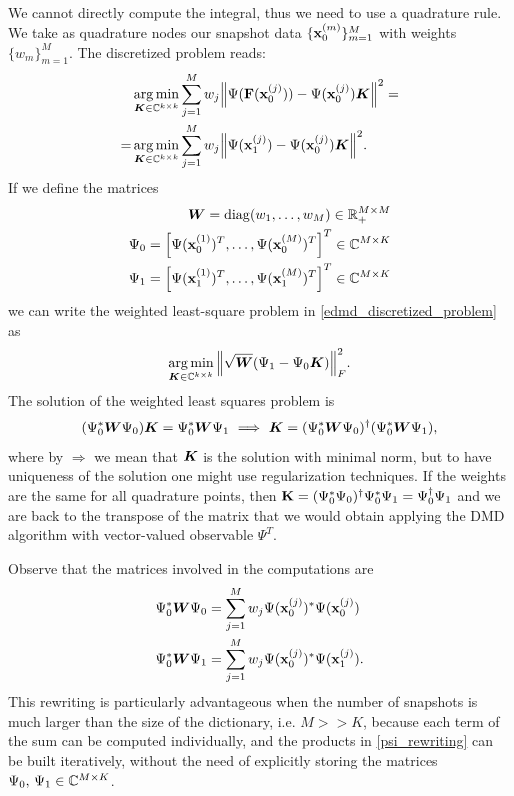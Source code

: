We cannot directly compute the integral, thus we need to use a quadrature rule. We take as quadrature nodes our snapshot data $\{\vb{x}_0^{(m)}\}_{m = 1}^M$ with weights $\{w_m\}_{m = 1}^M$. The discretized problem reads:
\begin{equation}
\label{edmd_discretized_problem}
\begin{split}
    &\operatorname*{arg\,min}_{\vb*{K}\in\mathbb{C}^{k\times k}} \sum_{j=1}^M w_j \norm{\Psi(\vb{F}(\vb{x}_0^{(j)})) - \Psi(\vb{x}_0^{(j)})\vb*{K}}^2 = \\
    = &\operatorname*{arg\,min}_{\vb*{K}\in\mathbb{C}^{k\times k}} \sum_{j=1}^M w_j \norm{\Psi(\vb{x}_1^{(j)}) - \Psi(\vb{x}_0^{(j)})\vb*{K}}^2.
\end{split}    
\end{equation}
If we define the matrices
\begin{align}
\label{w_def}
\vb*{W} = \mathrm{diag}(w_1,\dots,w_M)\in\mathbb{R}_+^{M\times M} \\
\label{psi0_def}
\Psi_0 = \left[\Psi(\vb{x}_0^{(1)})^T,\dots,\Psi(\vb{x}_0^{(M)})^T\right]^T\in\mathbb{C}^{M\times K} \\
\label{psi1_def}
\Psi_1 = \left[\Psi(\vb{x}_1^{(1)})^T,\dots,\Psi(\vb{x}_1^{(M)})^T\right]^T\in\mathbb{C}^{M\times K}
\end{align}
we can write the weighted least-square problem in \eqref{edmd_discretized_problem} as 
\begin{equation}
    \label{edmd_discretized_problem_matrix}
    \operatorname*{arg\,min}_{\vb*{K}\in\mathbb{C}^{k\times k}}\norm{\sqrt{\vb*{W}}(\Psi_1 - \Psi_0\vb*{K})}_F^2.
\end{equation}
The solution of the weighted least squares problem is
\begin{equation}
    \label{discretized_problem_solution}
    (\Psi_0^*\vb*{W}\Psi_0)\vb*{K} = \Psi_0^*\vb*{W}\Psi_1 \,\,\Longrightarrow\,\, \vb*{K} = (\Psi_0^*\vb*{W}\Psi_0)^{\dagger}(\Psi_0^*\vb*{W}\Psi_1),
\end{equation}
where by $\Longrightarrow$ we mean that $\vb*{K}$ is the solution with minimal norm, but to have uniqueness of the solution one might use regularization techniques. If the weights are the same for all quadrature points, then $\vb{K} = (\Psi_0^*\Psi_0)^{\dagger} \Psi_0^*\Psi_1 = \Psi_0^{\dagger}\Psi_1$ and we are back to the transpose of the matrix that we would obtain applying the DMD algorithm with vector-valued observable $\Psi^T$.

Observe that the matrices involved in the computations are
\begin{equation*}
    \label{psi_rewriting}
    \begin{split}
        \Psi_0^*\vb*{W}\Psi_0 & = \sum_{j=1}^M w_j \Psi(\vb{x}_0^{(j)})^* \Psi(\vb{x}_0^{(j)})\\
        \Psi_0^*\vb*{W}\Psi_1 & = \sum_{j=1}^M w_j \Psi(\vb{x}_0^{(j)})^* \Psi(\vb{x}_1^{(j)}).
    \end{split}
\end{equation*}
This rewriting is particularly advantageous when the number of snapshots is much larger than the size of the dictionary, i.e. $M >> K$, because each term of the sum can be computed individually, and the products in \eqref{psi_rewriting} can be built iteratively, without the need of explicitly storing the matrices $\Psi_0,\,\Psi_1\in\mathbb{C}^{M\times K}$.

